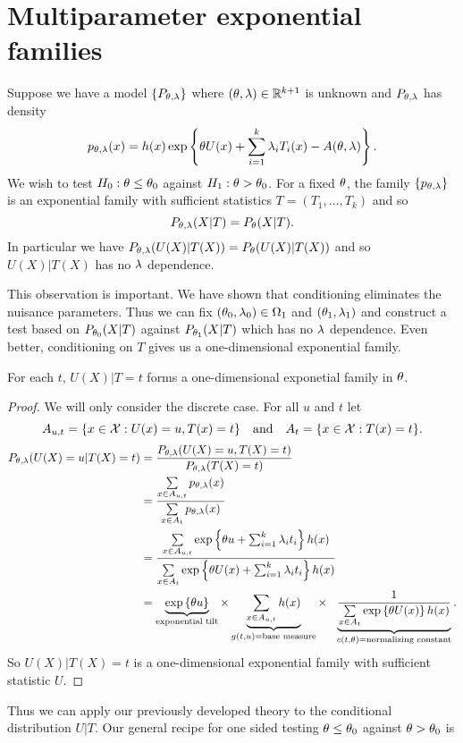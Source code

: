 \section{Multiparameter exponential families}
Suppose we have a model $\{P_{{\theta},\lambda}\}$ where $({\theta},\lambda) \in {\mathbb R}^{k+1}$ is unknown and $P_{{\theta},\lambda}$ has density
\[p_{{\theta},\lambda}(x) = h(x) \exp\left\{{\theta} U(x)+\sum_{i=1}^k \lambda_i T_i(x) - A({\theta},\lambda)\right\}. \]
We wish to test $H_0 : {\theta} \le {\theta}_0$ against $H_1 : {\theta} > {\theta}_0$. For a fixed ${\theta}$, the family $\{p_{{\theta},\lambda}\}$ is an exponential family with sufficient statistics $T = (T_1,\ldots, T_k)$ and so 
\[P_{{\theta},\lambda}(X|T) = P_{\theta}(X|T). \]
In particular we have $P_{{\theta},\lambda}(U(X)|T(X)) = P_{\theta}(U(X)|T(X))$ and so $U(X)|T(X)$ has no $\lambda$ dependence.
\begin{remark}
    This observation is important. We have shown that conditioning eliminates the nuisance parameters. Thus we can fix $({\theta}_0,\lambda_0) \in {{\Omega}}_1$ and $({\theta}_1,\lambda_1)$ and construct a test based on $P_{{\theta}_0}(X|T)$ against $P_{{\theta}_1}(X|T)$ which has no $\lambda$ dependence. Even better, conditioning on $T$ gives us a one-dimensional exponential family.
\end{remark}
\begin{lemma}
    For each $t$, $U(X)|T=t$ forms a one-dimensional exponetial family in ${\theta}$.
\end{lemma}
\begin{proof}
    We will only consider the discrete case. For all $u$ and $t$ let
    \[A_{u,t} = \{x \in {\mathcal{X}} : U(x)=u, T(x)=t\}~~~\text{and}~~~ A_t = \{x \in {\mathcal{X}}: T(x)=t\}. \]
    \begin{align*}
        P_{{\theta},\lambda}(U(X)=u|T(X)=t) &= \frac{P_{{\theta},\lambda}(U(X)=u, T(X)=t)}{P_{{\theta},\lambda}(T(X)=t)}\\
        &=\frac{\sum\limits_{x\in A_{u,t}}p_{{\theta},\lambda}(x)}{\sum\limits_{x \in A_t}p_{{\theta},\lambda}(x)}\\
        &=\frac{\sum\limits_{x\in A_{u,t}}\exp\left\{{\theta} u + \sum_{i=1}^k \lambda_i t_i\right\}h(x)}{\sum\limits_{x \in A_t}\exp\left\{{\theta} U(x)+\sum_{i=1}^k \lambda_i t_i\right\}h(x)}\\
        &=\underbrace{\exp\left\{{\theta} u\right\}}_{\text{exponential tilt}} \times \underbrace{\sum_{x \in A_{u,t}} h(x)}_{g(t,u) = \text{base measure}} \times ~~\underbrace{\frac{1}{\sum\limits_{x \in A_t} \exp\left\{{\theta} U(x)\right\}h(x)}}_{c(t,{\theta})=\text{normalizing constant}}.
    \end{align*}
    So $U(X)|T(X)=t$ is a one-dimensional exponential family with sufficient statistic $U$.
\end{proof}
Thus we can apply our previously developed theory to the conditional distribution $U|T$. Our general recipe for one sided testing ${\theta} \le {\theta}_0$ against ${\theta} > {\theta}_0$ is 
